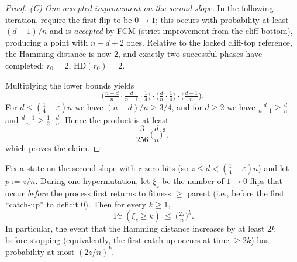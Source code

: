 \documentclass[lettersize,journal]{IEEEtran}
\newcommand{\HD}{\text{HD}}
\begin{document}
\begin{proof}
	\emph{(C) One accepted improvement on the second slope.} In the following iteration, require the first flip to be $0\!\to 1$; this occurs with probability at least $(d-1)/n$ and is \emph{accepted} by FCM (strict improvement from the cliff-bottom), producing a point with $n-d+2$ ones. Relative to the locked cliff-top reference, the Hamming distance is now $2$, and exactly two successful phases have completed: $r_0=2$, $\HD(r_0)=2$.
	
	Multiplying the lower bounds yields
	\[
	\Big(\tfrac{n-d}{n}\cdot\tfrac{d}{n-1}\cdot\tfrac14\Big)\cdot
	\Big(\tfrac{d}{n}\cdot\tfrac14\Big)\cdot
	\Big(\tfrac{d-1}{n}\Big).
	\]
	For $d\le(\tfrac14-\varepsilon)n$ we have $(n-d)/n\ge 3/4$, and for $d\ge 2$ we have $\tfrac{d}{n-1}\ge\tfrac{d}{n}$ and $\tfrac{d-1}{n}\ge \tfrac12\cdot\tfrac{d}{n}$. Hence the product is at least
	\[
	\frac{3}{256}\,\Big(\frac{d}{n}\Big)^{\!3},
	\]
	which proves the claim.
\end{proof}



\begin{lemma}\label{lem:xi-tail}
	Fix a state on the second slope with $z$ zero-bits (so $z\le d<(\tfrac14-\varepsilon)n$) and let $p:=z/n$.
	During one hypermutation, let $\xi_z$ be the number of $1\!\to 0$ flips that occur \emph{before} the process first returns to fitness $\ge$ parent (i.e., before the first ``catch-up'' to deficit $0$). Then for every $k\ge 1$,
	\[
	\Pr(\xi_z\ge k)\ \le\ \Big(\tfrac{2z}{n}\Big)^k.
	\]
	In particular, the event that the Hamming distance increases by at least $2k$ before stopping (equivalently, the first catch-up occurs at time $\ge 2k$) has probability at most $(2z/n)^k$.
\end{lemma}
\end{document}
